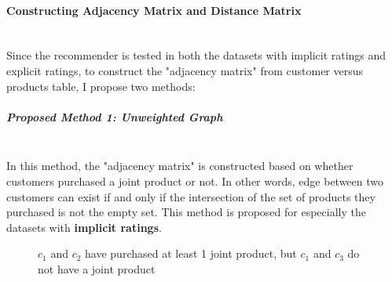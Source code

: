 	\paragraph{Constructing Adjacency Matrix and Distance Matrix}\mbox{}\\
	Since the recommender is tested in both the datasets with implicit ratings and explicit ratings, to construct the "adjacency matrix" from customer versus products table, I propose two methods: 
	\subparagraph{Proposed Method 1: Unweighted Graph}\mbox{}\\
	In this method, the "adjacency matrix" is constructed based on whether customers purchased a joint product or not. In other words, edge between two customers can exist if and only if the intersection of the set of products they purchased is not the empty set. This method is proposed for especially the datasets with \textbf{implicit ratings}.
	\begin{figure}[H]
		\centering
		\caption{$c_{1}$ and $c_{2}$ have purchased at least 1 joint product, but $c_{1}$ and $c_{3}$ do not have a joint product}
	\end{figure}
	
